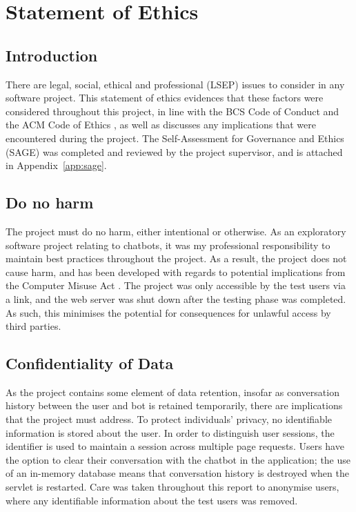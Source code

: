 \chapter{Statement of Ethics}
\label{ch:ethics}

\section{Introduction}
There are legal, social, ethical and professional (LSEP) issues to consider in any software project. This statement of ethics evidences that these factors were considered throughout this project, in line with the BCS Code of Conduct \cite{bcs2019conduct} and the ACM Code of Ethics \cite{acm}, as well as discusses any implications that were encountered during the project. The Self-Assessment for Governance and Ethics (SAGE) was completed and reviewed by the project supervisor, and is attached in Appendix~\ref{app:sage}.

\section{Do no harm}
The project must do no harm, either intentional or otherwise. As an exploratory software project relating to chatbots, it was my professional responsibility to maintain best practices throughout the project. As a result, the project does not cause harm, and has been developed with regards to potential implications from the Computer Misuse Act \cite{cma}. The project was only accessible by the test users via a link, and the web server was shut down after the testing phase was completed. As such, this minimises the potential for consequences for unlawful access by third parties.

\section{Confidentiality of Data}
\label{sec:confid}
As the project contains some element of data retention, insofar as conversation history between the user and bot is retained temporarily, there are implications that the project must address. To protect individuals' privacy, no identifiable information is stored about the user. In order to distinguish user sessions, the  identifier is used to maintain a session across multiple page requests. Users have the option to clear their conversation with the chatbot in the application; the use of an in-memory database means that conversation history is destroyed when the servlet is restarted. Care was taken throughout this report to anonymise users, where any identifiable information about the test users was removed.

